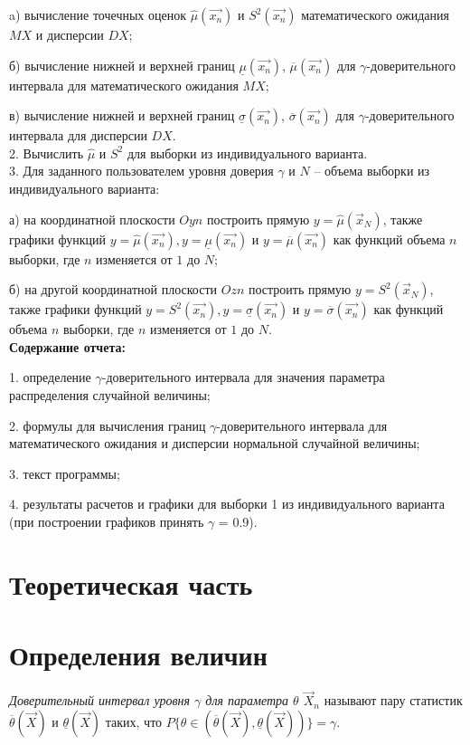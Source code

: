 	a) вычисление точечных оценок $\hat\mu(\overrightarrow{x_n})$ и $S^2(\overrightarrow{x_n})$ математического ожидания $MX$ и дисперсии $DX$;
	
	б) вычисление нижней и верхней границ  $\underline\mu(\overrightarrow{x_n})$,  $\overline\mu(\overrightarrow{x_n})$ для $\gamma$-доверительного интервала для
	математического ожидания $MX$;
	
	в) вычисление нижней и верхней границ $\underline\sigma(\overrightarrow{x_n})$,
	$\overline\sigma(\overrightarrow{x_n})$ для $\gamma$-доверительного интервала для дисперсии
	$ DX$.
\\
2. Вычислить $\hat\mu$ и $S^2$ для выборки из индивидуального варианта.
\\
3. Для заданного пользователем уровня доверия $\gamma$ и $N$ – объема выборки из индивидуального
варианта:

а) на координатной плоскости $Oyn$ построить прямую $y = \hat\mu(\overrightarrow{x}_N)$, также графики функций
$y = \hat\mu(\overrightarrow{x_n}), y = \underline\mu(\overrightarrow{x_n})$ и $y = \overline\mu(\overrightarrow{x_n})$ как функций объема $n$ выборки, где $n$ изменяется от $1$
до $N$;

б) на другой координатной плоскости $Ozn$ построить прямую  $y = S^2(\overrightarrow{x}_N)$, также графики
функций $y = S^2(\overrightarrow{x_n}), y = \underline\sigma(\overrightarrow{x_n})$ и $y = \overline\sigma(\overrightarrow{x_n})$ как функций объема $n$ выборки, где $n$
изменяется от $1$ до $N$.\\
\textbf{Содержание отчета:}

1. определение $\gamma$-доверительного интервала для значения параметра распределения случайной
величины;

2. формулы для вычисления границ $\gamma$-доверительного интервала для математического ожидания
и дисперсии нормальной случайной величины;

3. текст программы;

4. результаты расчетов и графики для выборки
1 из индивидуального варианта (при построении
графиков принять $\gamma$ = 0.9).

\section*{Теоретическая часть}

\section*{Определения величин
}
\begin{defn}
	\emph{Доверительный интервал уровня $\gamma$ для параметра $\theta$  $\vec{X}_n$} называют пару статистик $\overline\theta(\overrightarrow{X})$ и $\underline\theta(\overrightarrow{X})$ таких, что $P\{\theta \in (\overline\theta(\overrightarrow{X}), \underline\theta(\overrightarrow{X}))\} = \gamma$.
\end{defn}

